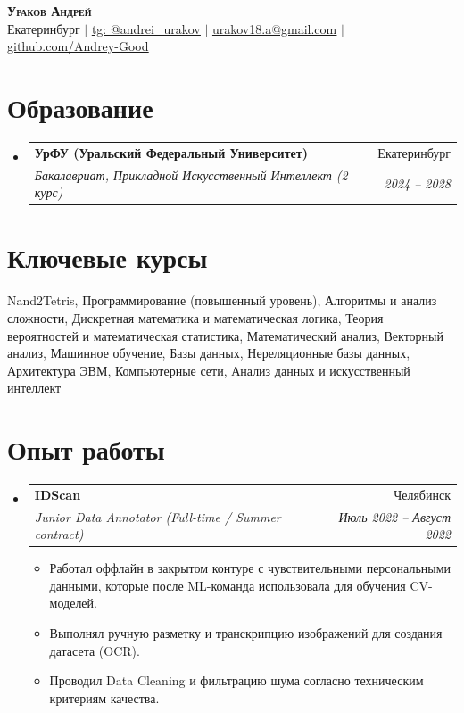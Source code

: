 \documentclass[letterpaper,10pt]{article}
\makeatletter
\newcommand{\resumeItem}[1]{
  \item\small{
    {#1 \vspace{-2pt}}
  }
}
\newcommand{\resumeSubheading}[4]{
  \vspace{-1pt}\item
    \begin{tabular*}{0.97\textwidth}[t]{l@{\extracolsep{\fill}}r}
      \textbf{#1} & #2 \\
      \textit{\small#3} & \textit{\small #4} \\
    \end{tabular*}\vspace{-7pt}
}
\newcommand{\resumeSubHeadingListStart}{\begin{itemize}[leftmargin=0.15in, label={}]}
\newcommand{\resumeSubHeadingListEnd}{\end{itemize}}
\newcommand{\resumeItemListStart}{\begin{itemize}[itemsep=0pt, parsep=0pt, topsep=1pt]}
\newcommand{\resumeItemListEnd}{\end{itemize}\vspace{-5pt}}
\makeatother
\begin{document}
\begin{center}
    \textbf{\Huge \scshape Ураков Андрей} \\ \vspace{1pt}
    \small{}Екатеринбург $|$ \href{https://t.me/andrei\_urakov}{\underline{tg: @andrei\_urakov}} $|$ \href{mailto:urakov18.a@gmail.com}{\underline{urakov18.a@gmail.com}} $|$ \href{https://github.com/Andrey-Good}{\underline{github.com/Andrey-Good}}\end{center}

\section{Образование}
  \resumeSubHeadingListStart
    \resumeSubheading
      {УрФУ (Уральский Федеральный Университет)}{Екатеринбург}
      {Бакалавриат, Прикладной Искусственный Интеллект (2 курс)}{2024 -- 2028}
  \resumeSubHeadingListEnd

\section{Ключевые курсы}
 \begin{itemize}[leftmargin=0.15in, label={}]
    \small{\item{Nand2Tetris, Программирование (повышенный уровень), Алгоритмы и анализ сложности, Дискретная математика и математическая логика, Теория вероятностей и математическая статистика, Математический анализ, Векторный анализ, Машинное обучение, Базы данных, Нереляционные базы данных, Архитектура ЭВМ, Компьютерные сети, Анализ данных и искусственный интеллект}}
 \end{itemize}

\section{Опыт работы}
  \resumeSubHeadingListStart
    \resumeSubheading
      {IDScan}{Челябинск}
      {Junior Data Annotator (Full-time / Summer contract)}{Июль 2022 -- Август 2022}
      \resumeItemListStart
        \resumeItem{Работал оффлайн в закрытом контуре с чувствительными персональными данными, которые после ML-команда использовала для обучения CV-моделей.}
        \resumeItem{Выполнял ручную разметку и транскрипцию изображений для создания датасета (OCR).}
        \resumeItem{Проводил Data Cleaning и фильтрацию шума согласно техническим критериям качества.}
      \resumeItemListEnd
  \resumeSubHeadingListEnd
\end{document}

